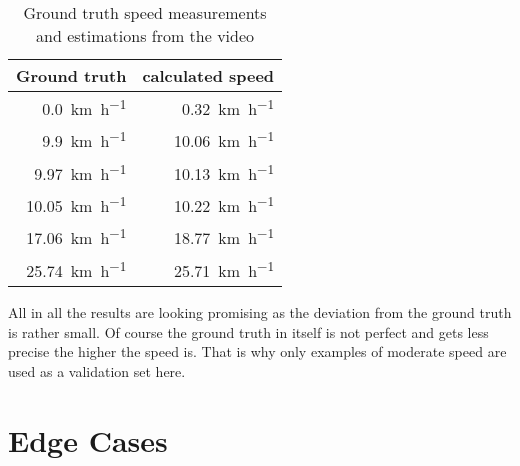 \begin{table}[]
    \centering
    \begin{tabular}{|r|r|}
        \hline
        \multicolumn{1}{|l|}{Ground truth} & \multicolumn{1}{l|}{calculated speed} \\ \hline
        \SI{0.0}{\kilo\metre\per\hour}     & \SI{0.32}{\kilo\metre\per\hour}      \\
        \SI{9.9}{\kilo\metre\per\hour}     & \SI{10.06}{\kilo\metre\per\hour}      \\
        \SI{9.97}{\kilo\metre\per\hour}    & \SI{10.13}{\kilo\metre\per\hour}      \\
        \SI{10.05}{\kilo\metre\per\hour}   & \SI{10.22}{\kilo\metre\per\hour}      \\
        \SI{17.06}{\kilo\metre\per\hour}   & \SI{18.77}{\kilo\metre\per\hour}      \\
        \SI{25.74}{\kilo\metre\per\hour}   & \SI{25.71}{\kilo\metre\per\hour}      \\ \hline
    \end{tabular}
    \caption{Ground truth speed measurements \\and estimations from the video}
    \label{tab:speedEstimation}
\end{table}

All in all the results are looking promising as the deviation from the ground truth is rather small.
Of course the ground truth in itself is not perfect and gets less precise the higher the speed is.
That is why only examples of moderate speed are used as a validation set here.




\section{Edge Cases}


